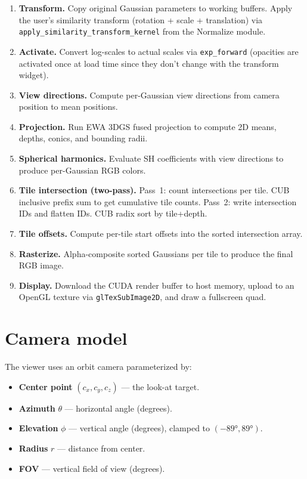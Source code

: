 \documentclass[11pt]{article}
\begin{document}
\begin{enumerate}
  \item \textbf{Transform.} Copy original Gaussian parameters to working
        buffers. Apply the user's similarity transform (rotation +
        scale + translation) via \texttt{apply\_similarity\_transform\_kernel}
        from the Normalize module.

  \item \textbf{Activate.} Convert log-scales to actual scales via
        \texttt{exp\_forward} (opacities are activated once at load time
        since they don't change with the transform widget).

  \item \textbf{View directions.} Compute per-Gaussian view directions
        from camera position to mean positions.

  \item \textbf{Projection.} Run EWA 3DGS fused projection to compute
        2D means, depths, conics, and bounding radii.

  \item \textbf{Spherical harmonics.} Evaluate SH coefficients with view
        directions to produce per-Gaussian RGB colors.

  \item \textbf{Tile intersection (two-pass).}
        Pass~1: count intersections per tile.
        CUB inclusive prefix sum to get cumulative tile counts.
        Pass~2: write intersection IDs and flatten IDs.
        CUB radix sort by tile+depth.

  \item \textbf{Tile offsets.} Compute per-tile start offsets into the
        sorted intersection array.

  \item \textbf{Rasterize.} Alpha-composite sorted Gaussians per tile
        to produce the final RGB image.

  \item \textbf{Display.} Download the CUDA render buffer to host memory,
        upload to an OpenGL texture via \texttt{glTexSubImage2D}, and draw
        a fullscreen quad.
\end{enumerate}

\section{Camera model}

The viewer uses an orbit camera parameterized by:
\begin{itemize}
  \item \textbf{Center point} $(c_x, c_y, c_z)$ --- the look-at target.
  \item \textbf{Azimuth} $\theta$ --- horizontal angle (degrees).
  \item \textbf{Elevation} $\phi$ --- vertical angle (degrees), clamped to
        $(-89°, 89°)$.
  \item \textbf{Radius} $r$ --- distance from center.
  \item \textbf{FOV} --- vertical field of view (degrees).
\end{itemize}
\end{document}

